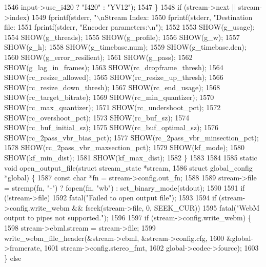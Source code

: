 \begin{DoxyCodeInclude}
{{{{{{{{{{{{{{{{{{{{{{{{{{{{{{{{{{{{{{{{{{{{1546             input->use\_i420 ? \textcolor{stringliteral}{"I420"} : \textcolor{stringliteral}{"YV12"});
1547   \}
1548   \textcolor{keywordflow}{if} (stream->next || stream->index)
1549     fprintf(stderr, \textcolor{stringliteral}{"\(\backslash\)nStream Index: %
1550   fprintf(stderr, \textcolor{stringliteral}{"Destination file: %
1551   fprintf(stderr, \textcolor{stringliteral}{"Encoder parameters:\(\backslash\)n"});
1552 
1553   SHOW(g\_usage);
1554   SHOW(g\_threads);
1555   SHOW(g\_profile);
1556   SHOW(g\_w);
1557   SHOW(g\_h);
1558   SHOW(g\_timebase.num);
1559   SHOW(g\_timebase.den);
1560   SHOW(g\_error\_resilient);
1561   SHOW(g\_pass);
1562   SHOW(g\_lag\_in\_frames);
1563   SHOW(rc\_dropframe\_thresh);
1564   SHOW(rc\_resize\_allowed);
1565   SHOW(rc\_resize\_up\_thresh);
1566   SHOW(rc\_resize\_down\_thresh);
1567   SHOW(rc\_end\_usage);
1568   SHOW(rc\_target\_bitrate);
1569   SHOW(rc\_min\_quantizer);
1570   SHOW(rc\_max\_quantizer);
1571   SHOW(rc\_undershoot\_pct);
1572   SHOW(rc\_overshoot\_pct);
1573   SHOW(rc\_buf\_sz);
1574   SHOW(rc\_buf\_initial\_sz);
1575   SHOW(rc\_buf\_optimal\_sz);
1576   SHOW(rc\_2pass\_vbr\_bias\_pct);
1577   SHOW(rc\_2pass\_vbr\_minsection\_pct);
1578   SHOW(rc\_2pass\_vbr\_maxsection\_pct);
1579   SHOW(kf\_mode);
1580   SHOW(kf\_min\_dist);
1581   SHOW(kf\_max\_dist);
1582 \}
1583 
1584 
1585 \textcolor{keyword}{static} \textcolor{keywordtype}{void} open\_output\_file(\textcolor{keyword}{struct} stream\_state *stream,
1586                              \textcolor{keyword}{struct} global\_config *global) \{
1587   \textcolor{keyword}{const} \textcolor{keywordtype}{char} *fn = stream->config.out\_fn;
1588 
1589   stream->file = strcmp(fn, \textcolor{stringliteral}{"-"}) ? fopen(fn, \textcolor{stringliteral}{"wb"}) : set\_binary\_mode(stdout);
1590 
1591   \textcolor{keywordflow}{if} (!stream->file)
1592     fatal(\textcolor{stringliteral}{"Failed to open output file"});
1593 
1594   \textcolor{keywordflow}{if} (stream->config.write\_webm && fseek(stream->file, 0, SEEK\_CUR))
1595     fatal(\textcolor{stringliteral}{"WebM output to pipes not supported."});
1596 
1597   \textcolor{keywordflow}{if} (stream->config.write\_webm) \{
1598     stream->ebml.stream = stream->file;
1599     write\_webm\_file\_header(&stream->ebml, &stream->config.cfg,
1600                            &global->framerate,
1601                            stream->config.stereo\_fmt,
1602                            global->codec->fourcc);
1603   \} \textcolor{keywordflow}{else}
}}}}}}}}}}}}}}}}}}}}}}}}}}}}}}}}}}}}}}}}}}}}}}
\end{DoxyCodeInclude}

